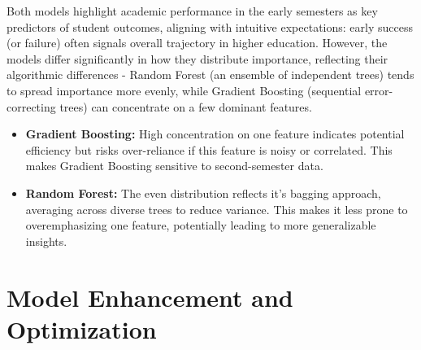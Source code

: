 \documentclass[twoside,final]{hcmut-report}
\begin{document}
Both models highlight academic performance in the early semesters as key predictors of student outcomes, aligning with intuitive expectations: early success (or failure) often signals overall trajectory in higher education. However, the models differ significantly in how they distribute importance, reflecting their algorithmic differences - Random Forest (an ensemble of independent trees) tends to spread importance more evenly, while Gradient Boosting (sequential error-correcting trees) can concentrate on a few dominant features.
\begin{itemize}
  \item \textbf{Gradient Boosting:} High concentration on one feature indicates potential efficiency but risks over-reliance if this feature is noisy or correlated. This makes Gradient Boosting sensitive to second-semester data.
  \item \textbf{Random Forest:} The even distribution reflects it's bagging approach, averaging across diverse trees to reduce variance. This makes it less prone to overemphasizing one feature, potentially leading to more generalizable insights.
\end{itemize}

\section{Model Enhancement and Optimization}
\end{document}
